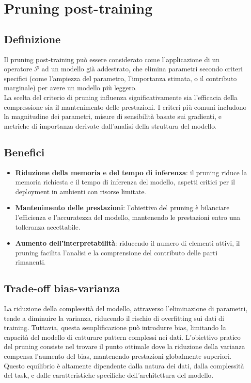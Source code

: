 \documentclass[a4paper,12pt]{report}
\begin{document}
	\section{Pruning post-training}
	
	\subsection{Definizione}
	Il pruning post-training può essere considerato come l'applicazione di un operatore $\mathcal{P}$ ad un modello già addestrato, che elimina parametri secondo criteri specifici (come l'ampiezza del parametro, l'importanza stimata, o il contributo marginale) per avere un modello più leggero. \\
	La scelta del criterio di pruning influenza significativamente sia l'efficacia della compressione sia il mantenimento delle prestazioni. I criteri più comuni includono la magnitudine dei parametri, misure di sensibilità basate sui gradienti, e metriche di importanza derivate dall'analisi della struttura del modello.
	
	\subsection{Benefici}
	\begin{itemize}
		\item \textbf{Riduzione della memoria e del tempo di inferenza}: il pruning riduce la memoria richiesta e il tempo di inferenza del modello, aspetti critici per il deployment in ambienti con risorse limitate.
		\item \textbf{Mantenimento delle prestazioni}: l'obiettivo del pruning è bilanciare l'efficienza e l'accuratezza del modello, mantenendo le prestazioni entro una tolleranza accettabile.
		\item \textbf{Aumento dell'interpretabilità}: riducendo il numero di elementi attivi, il pruning facilita l'analisi e la comprensione del contributo delle parti rimanenti.
	\end{itemize}
	
	\subsection{Trade-off bias-varianza}
	La riduzione della complessità del modello, attraverso l'eliminazione di parametri, tende a diminuire la varianza, riducendo il rischio di overfitting sui dati di training. Tuttavia, questa semplificazione può introdurre bias, limitando la capacità del modello di catturare pattern complessi nei dati. L'obiettivo pratico del pruning consiste nel trovare il punto ottimale dove la riduzione della varianza compensa l'aumento del bias, mantenendo prestazioni globalmente superiori. Questo equilibrio è altamente dipendente dalla natura dei dati, dalla complessità del task, e dalle caratteristiche specifiche dell'architettura del modello.
	
\end{document}
